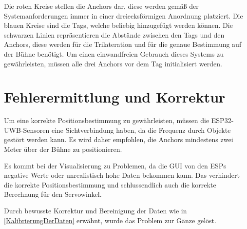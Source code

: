 Die roten Kreise stellen die Anchors dar, diese werden gemäß der Systemanforderungen immer in einer dreiecksförmigen Anordnung platziert. Die blauen Kreise sind die Tags, welche beliebig hinzugefügt werden können. Die schwarzen Linien repräsentieren die Abstände zwischen den Tags und den Anchors, diese werden für die Trilateration und für die genaue Bestimmung auf der Bühne benötigt. Um einen einwandfreien Gebrauch dieses Systems zu gewährleisten, müssen alle drei Anchors vor dem Tag initialisiert werden. 

\newpage
\section{Fehlerermittlung und Korrektur}
Um eine korrekte Positionsbestimmung zu gewährleisten, müssen die ESP32-UWB-Sensoren eine Sichtverbindung haben, da die Frequenz durch Objekte gestört werden kann. Es wird daher empfohlen, die Anchors mindestens zwei Meter über der Bühne zu positionieren.

Es kommt bei der Visualisierung zu Problemen, da die GUI von den ESPs negative Werte oder unrealistisch hohe Daten bekommen kann. Das verhindert die korrekte Positionsbestimmung und schlussendlich auch die korrekte Berechnung für den Servowinkel. 

Durch bewusste Korrektur und Bereinigung der Daten wie in \ref{KalibrierungDerDaten} erwähnt, wurde das Problem zur Gänze gelöst.

